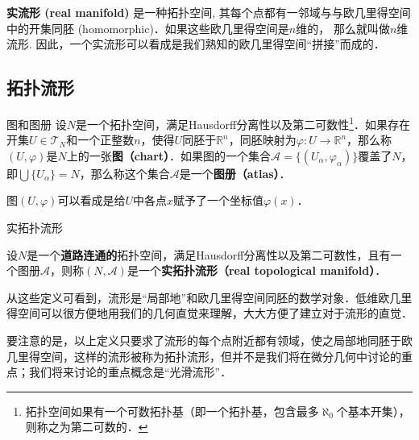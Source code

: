 


\textbf{实流形 (real manifold)} 是一种拓扑空间, 其每个点都有一邻域与与欧几里得空间中的开集同胚 (homomorphic)．如果这些欧几里得空间是$n$维的， 那么就叫做$n$维流形. 因此，一个实流形可以看成是我们熟知的欧几里得空间“拼接”而成的．

\subsection{拓扑流形}

\begin{definition}{图和图册}\label{Manif_def1}
设$N$是一个拓扑空间，满足Hausdorff分离性以及第二可数性\footnote{拓扑空间如果有一个可数拓扑基（即一个拓扑基，包含最多$\aleph_0$个基本开集），则称之为第二可数的．}．如果存在开集$U\in\mathcal{T}_N$和一个正整数$n$，使得$U$同胚于$\mathbb{R}^n$，同胚映射为$\varphi:U\rightarrow\mathbb{R}^n$，那么称$(U,\varphi)$是$N$上的一张\textbf{图（chart）}．如果图的一个集合$\mathcal{A}=\{(U_\alpha, \varphi_\alpha)\}$覆盖了$N$，即$\bigcup\{U_\alpha\}=N$，那么称这个集合$\mathcal{A}$是一个\textbf{图册（atlas）}．
\end{definition}

图$(U, \varphi)$可以看成是给$U$中各点$x$赋予了一个坐标值$\varphi(x)$．

\begin{definition}{实拓扑流形}\label{Manif_def2}

设$N$是一个\textbf{道路连通的}拓扑空间，满足Hausdorff分离性以及第二可数性，且有一个图册$\mathcal{A}$，则称$(N, \mathcal{A})$是一个\textbf{实拓扑流形（real topological manifold）}．

\end{definition}

从这些定义可看到，流形是“局部地”和欧几里得空间同胚的数学对象．低维欧几里得空间可以很方便地用我们的几何直觉来理解，大大方便了建立对于流形的直觉．

要注意的是，以上定义只要求了流形的每个点附近都有领域，使之局部地同胚于欧几里得空间，这样的流形被称为拓扑流形，但并不是我们将在微分几何中讨论的重点；我们将来讨论的重点概念是“光滑流形”．


